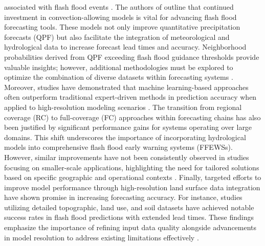 associated with flash flood events \citep{Hinge2024}. The authors of outline that continued investment in convection-allowing models is vital for advancing flash flood forecasting tools. These models not only improve quantitative precipitation forecasts (QPF) but also facilitate the integration of meteorological and hydrological data to increase forecast lead times and accuracy. Neighborhood probabilities derived from QPF exceeding flash flood guidance thresholds provide valuable insights; however, additional methodologies must be explored to optimize the combination of diverse datasets within forecasting systems \citep{Barthold2015}. Moreover, studies have demonstrated that machine learning-based approaches often outperform traditional expert-driven methods in prediction accuracy when applied to high-resolution modeling scenarios \citep{Hinge2024}. The transition from regional coverage (RC) to full-coverage (FC) approaches within forecasting chains has also been justified by significant performance gains for systems operating over large domains. This shift underscores the importance of incorporating hydrological models into comprehensive flash flood early warning systems (FFEWSs). However, similar improvements have not been consistently observed in studies focusing on smaller-scale applications, highlighting the need for tailored solutions based on specific geographic and operational contexts \citep{Zanchetta2020}. Finally, targeted efforts to improve model performance through high-resolution land surface data integration have shown promise in increasing forecasting accuracy. For instance, studies utilizing detailed topographic, land use, and soil datasets have achieved notable success rates in flash flood predictions with extended lead times. These findings emphasize the importance of refining input data quality alongside advancements in model resolution to address existing limitations effectively \citep{AlRawas2024}.

